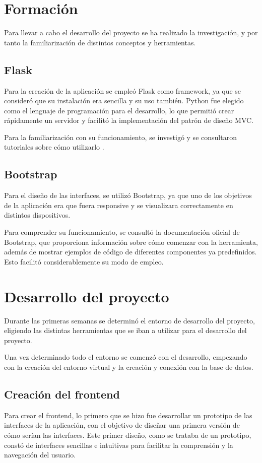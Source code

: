 \section{Formación}
Para llevar a cabo el desarrollo del proyecto se ha realizado la investigación, y por tanto la familiarización de distintos conceptos y herramientas. 
\subsection{Flask}
Para la creación de la aplicación se empleó Flask como framework, ya que se consideró que su instalación era sencilla y su uso también. Python fue elegido como el lenguaje de programación para el desarrollo, lo que permitió crear rápidamente un servidor y facilitó la implementación del patrón de diseño MVC.

Para la familiarización con su funcionamiento, se investigó y se consultaron tutoriales sobre cómo utilizarlo \cite{formacion_flask}.

\subsection{Bootstrap}
Para el diseño de las interfaces, se utilizó Bootstrap, ya que uno de los objetivos de la aplicación era que fuera responsive y se visualizara correctamente en distintos dispositivos. 

Para comprender su funcionamiento, se consultó la documentación oficial de Bootstrap\cite{doc-bootstrap}, que proporciona información sobre cómo comenzar con la herramienta, además de mostrar ejemplos de código de diferentes componentes ya predefinidos. Esto facilitó considerablemente su modo de empleo.
\section{Desarrollo del proyecto}
Durante las primeras semanas se determinó el entorno de desarrollo del proyecto, eligiendo las distintas herramientas que se iban a utilizar para el desarrollo del proyecto.

Una vez determinado todo el entorno se comenzó con el desarrollo, empezando con la creación del entorno virtual y la creación y conexión con la base de datos.

\subsection{Creación del frontend}
Para crear el frontend, lo primero que se hizo fue desarrollar un prototipo de las interfaces de la aplicación, con el objetivo de diseñar una primera versión de cómo serían las interfaces. Este primer diseño, como se trataba de un prototipo, constó de interfaces sencillas e intuitivas para facilitar la comprensión y la navegación del usuario.

